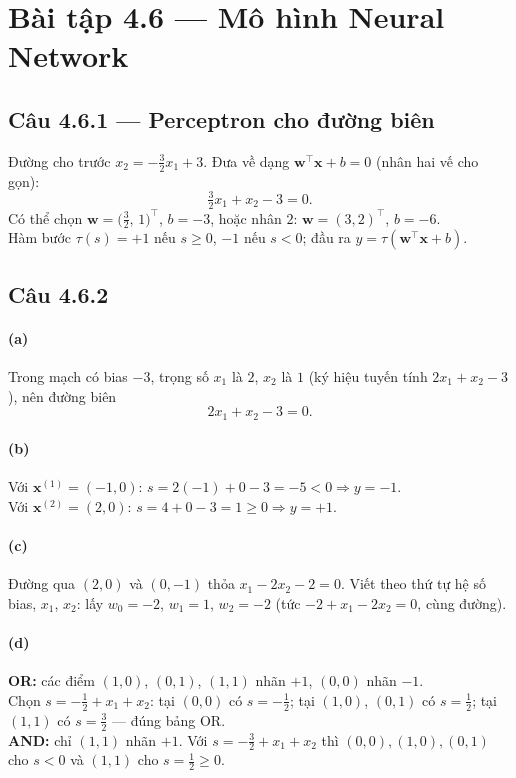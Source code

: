 \section*{Bài tập 4.6 --- Mô hình Neural Network}

\subsection*{Câu 4.6.1 --- Perceptron cho đường biên}

Đường cho trước $x_2 = -\tfrac{3}{2}x_1 + 3$. Đưa về dạng $\mathbf{w}^\top\mathbf{x}+b=0$ (nhân hai vế cho gọn):
\[
\tfrac{3}{2}x_1 + x_2 - 3 = 0.
\]
Có thể chọn $\mathbf{w} = \bigl(\tfrac{3}{2},\,1\bigr)^\top$, $b=-3$, hoặc nhân $2$: $\mathbf{w}=(3,2)^\top$, $b=-6$.\\
Hàm bước $\tau(s)=+1$ nếu $s\ge 0$, $-1$ nếu $s<0$; đầu ra $y=\tau(\mathbf{w}^\top\mathbf{x}+b)$.

\subsection*{Câu 4.6.2}

\paragraph{(a)} Trong mạch có bias $-3$, trọng số $x_1$ là $2$, $x_2$ là $1$ (ký hiệu tuyến tính $2x_1+x_2-3$), nên đường biên
\[
2x_1 + x_2 - 3 = 0.
\]

\paragraph{(b)} Với $\mathbf{x}^{(1)}=(-1,0)$: $s = 2(-1)+0-3=-5<0 \Rightarrow y=-1$.\\
Với $\mathbf{x}^{(2)}=(2,0)$: $s=4+0-3=1\ge 0 \Rightarrow y=+1$.

\paragraph{(c)} Đường qua $(2,0)$ và $(0,-1)$ thỏa $x_1-2x_2-2=0$. Viết theo thứ tự hệ số bias, $x_1$, $x_2$: lấy $w_0=-2$, $w_1=1$, $w_2=-2$ (tức $-2+x_1-2x_2=0$, cùng đường).

\paragraph{(d)} \textbf{OR:} các điểm $(1,0)$, $(0,1)$, $(1,1)$ nhãn $+1$, $(0,0)$ nhãn $-1$.\\
Chọn $s = -\tfrac{1}{2}+x_1+x_2$: tại $(0,0)$ có $s=-\tfrac{1}{2}$; tại $(1,0)$, $(0,1)$ có $s=\tfrac{1}{2}$; tại $(1,1)$ có $s=\tfrac{3}{2}$ — đúng bảng OR.\\
\textbf{AND:} chỉ $(1,1)$ nhãn $+1$. Với $s=-\tfrac{3}{2}+x_1+x_2$ thì $(0,0),(1,0),(0,1)$ cho $s<0$ và $(1,1)$ cho $s=\tfrac{1}{2}\ge 0$.

